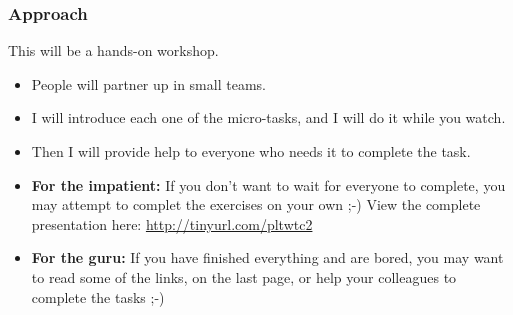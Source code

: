 \documentclass[hyperref={pdfpagelabels=true}]{beamer}
\begin{document}
\begin{frame}
\frametitle{Approach}
This will be a hands-on workshop.\small{ 
\begin{itemize}
  \item<2-> People will partner up in small teams.
  \item<3-> I will introduce each one of the micro-tasks, and I will do it while you watch.
  \item<4-> Then I will provide help to everyone who needs it to complete the task.
  \item<5-> \textbf{For the impatient:} If you don't want to wait for everyone to complete, you may attempt to complet the exercises on your own ;-) View the complete presentation here: \url{http://tinyurl.com/pltwtc2}
  \item<6-> \textbf{For the guru:} If you have finished everything and are bored, you may want to read some of the links, on the last page, or help your colleagues to complete the tasks ;-)
\end{itemize}}
\end{frame}
\end{document}
